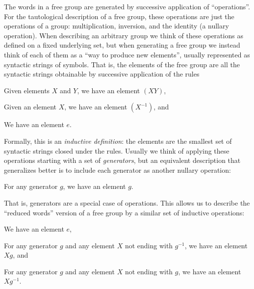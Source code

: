 \documentclass[10pt]{article}
\numberwithin{equation}{section}
\begin{document}
The words in a free group are generated by successive application of ``operations''.
For the tautological description of a free group, these operations are just the operations of a group: multiplication, inversion, and the identity (a nullary operation).
When describing an arbitrary group we think of these operations as defined on a fixed underlying set, but when generating a free group we instead think of each of them as a ``way to produce new elements'', usually represented as syntactic strings of symbols.
That is, the elements of the free group are all the syntactic strings obtainable by successive application of the rules
\begin{compactenum}[(i)]
\item Given elements $X$ and $Y$, we have an element $(X Y)$,
\item Given an element $X$, we have an element $(X^{-1})$, and
\item We have an element $e$.
\end{compactenum}
Formally, this is an \emph{inductive definition}: the elements are the smallest set of syntactic strings closed under the rules.
Usually we think of applying these operations starting with a set of \emph{generators}, but an equivalent description that generalizes better is to include each generator as another nullary operation:
\begin{compactenum}[(i)]\setcounter{enumi}{3}
\item For any generator $g$, we have an element $g$.
\end{compactenum}
That is, generators are a special case of operations.
This allows us to describe the ``reduced words'' version of a free group by a similar set of inductive operations:
\begin{compactenum}[(i)]
\item We have an element $e$,
\item For any generator $g$ and any element $X$ not ending with $g^{-1}$, we have an element $X g$, and
\item For any generator $g$ and any element $X$ not ending with $g$, we have an element $X g^{-1}$.
\end{compactenum}
\end{document}
